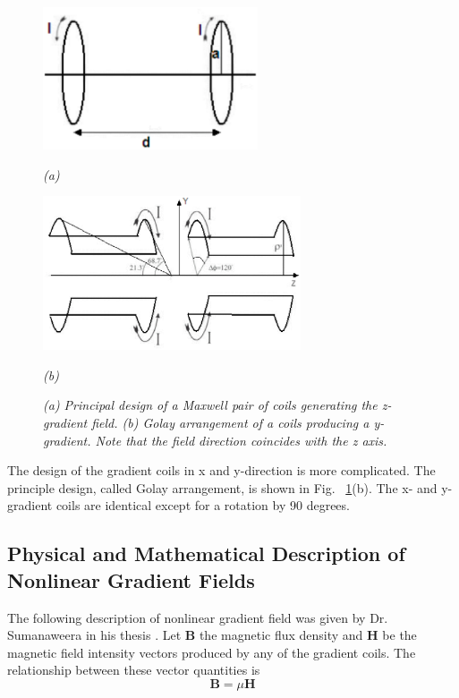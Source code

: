 \begin{figure}[htb]
  \begin{minipage}[b]{2.5in}
    \centering
    \centerline{\mbox{\includegraphics[width=2.5in]{background/images/coil_z.eps}}}
    \centerline{\mbox{\emph{(a)}}}
  \end{minipage}
  \begin{minipage}[b]{3in}
    \centering
    \centerline{\mbox{\includegraphics[width=3in]{background/images/coil_y.eps}}}
    \centerline{\mbox{\emph{(b)}}}
  \end{minipage}
\caption{\emph{(a) Principal design of a Maxwell pair of coils generating the z-gradient field. (b) Golay arrangement of a coils producing a y-gradient. Note that the field direction coincides with the z axis.}} \label{fig:coil_axis}
\end{figure}

The design of the gradient coils in x and y-direction is more complicated. The principle design, called Golay arrangement, is shown in Fig. ~\ref{fig:coil_axis}(b). The x- and y-gradient coils are identical except for a rotation by 90 degrees. 

\subsection{Physical and Mathematical Description of Nonlinear Gradient Fields}

The following description of nonlinear gradient field was given by Dr. Sumanaweera in his thesis 
\cite{sumanaweera_thesis}. Let \textbf{B} the magnetic flux density and \textbf{H} be the magnetic field intensity vectors produced by any of the gradient coils. The relationship between these vector quantities is 
\begin{equation}
  \textbf{B} = \mu \textbf{H}
\end{equation}

